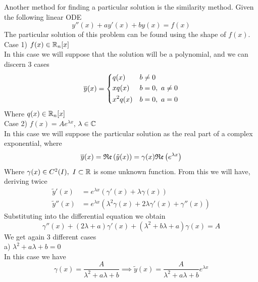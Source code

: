 \documentclass[../complete.tex]{subfiles}
\begin{document}
\begin{mtd}
	Another method for finding a particular solution is the similarity method. Given the following linear ODE
	\begin{equation*}
		y''(x)+ay'(x)+by(x)=f(x)
	\end{equation*}
	The particular solution of this problem can be found using the shape of $f(x)$.\\
	Case 1) $f(x)\in\mathbb{R}_n[x]$\\
	In this case we will suppose that the solution will be a polynomial, and we can discern 3 cases
	\begin{equation*}
		\overline{y}(x)=\begin{dcases}
			q(x)&b\ne0\\
			xq(x)&b=0,\ a\ne0\\
			x^2q(x)&b=0,\ a=0
		\end{dcases}
	\end{equation*}
	Where $q(x)\in\mathbb{R}_n[x]$\\
	Case 2) $f(x)=Ae^{\lambda x}$, $\lambda\in\mathbb{C}$\\
	In this case we will suppose the particular solution as the real part of a complex exponential, where
	\begin{equation*}
		\overline{y}(x)=\mathfrak{Re}\left( \tilde{y}(x) \right)=\gamma(x)\mathfrak{Re}\left( e^{\lambda x} \right)
	\end{equation*}
	Where $\gamma(x)\in C^2(I),\ I\subset\mathbb{R}$ is some unknown function. From this we will have, deriving twice
	\begin{equation*}
		\begin{aligned}
			\tilde{y}'(x)&=e^{\lambda x}\left( \gamma'(x)+\lambda\gamma(x) \right)\\
			\tilde{y}''(x)&=e^{\lambda x}\left( \lambda^2\gamma(x)+2\lambda\gamma'(x)+\gamma''(x) \right)
		\end{aligned}
	\end{equation*}
	Substituting into the differential equation we obtain
	\begin{equation*}
		\gamma''(x)+(2\lambda+a)\gamma'(x)+(\lambda^2+b\lambda+a)\gamma(x)=A
	\end{equation*}
	We get again 3 different cases\\
	a) $\lambda^2+a\lambda+b=0$\\
	In this case we have
	\begin{equation*}
		\gamma(x)=\frac{A}{\lambda^2+a\lambda+b}\implies{} \tilde{y}(x)=\frac{A}{\lambda^2+a\lambda+b}e^{\lambda x}
	\end{equation*}

\end{mtd}
\end{document}
